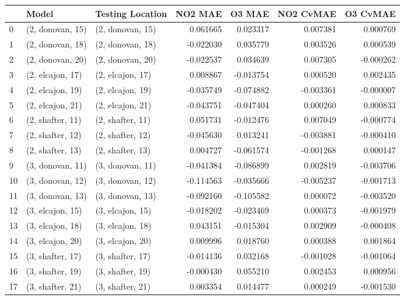 \begin{tabular}{lllrrrr}
\toprule
{} &             Model &  Testing Location &   NO2 MAE &    O3 MAE &  NO2 CvMAE &  O3 CvMAE \\
\midrule
0  &  (2, donovan, 15) &  (2, donovan, 15) &  0.061665 &  0.023317 &   0.007381 &  0.000769 \\
1  &  (2, donovan, 18) &  (2, donovan, 18) & -0.022030 &  0.035779 &   0.003526 &  0.000539 \\
2  &  (2, donovan, 20) &  (2, donovan, 20) & -0.022537 &  0.034639 &   0.007305 & -0.000262 \\
3  &  (2, elcajon, 17) &  (2, elcajon, 17) &  0.008867 & -0.013754 &   0.000520 &  0.002435 \\
4  &  (2, elcajon, 19) &  (2, elcajon, 19) & -0.035749 & -0.074882 &  -0.003361 & -0.000007 \\
5  &  (2, elcajon, 21) &  (2, elcajon, 21) & -0.043751 & -0.047404 &   0.000260 &  0.000833 \\
6  &  (2, shafter, 11) &  (2, shafter, 11) &  0.051731 & -0.012476 &   0.007049 & -0.000774 \\
7  &  (2, shafter, 12) &  (2, shafter, 12) & -0.045630 &  0.013241 &  -0.003881 & -0.000410 \\
8  &  (2, shafter, 13) &  (2, shafter, 13) &  0.004727 & -0.061574 &  -0.001268 &  0.000147 \\
9  &  (3, donovan, 11) &  (3, donovan, 11) & -0.041384 & -0.086899 &   0.002819 & -0.003706 \\
10 &  (3, donovan, 12) &  (3, donovan, 12) & -0.114563 & -0.035666 &  -0.005237 & -0.001713 \\
11 &  (3, donovan, 13) &  (3, donovan, 13) & -0.092160 & -0.105582 &   0.000072 & -0.003520 \\
12 &  (3, elcajon, 15) &  (3, elcajon, 15) & -0.018202 & -0.023469 &   0.000373 & -0.001979 \\
13 &  (3, elcajon, 18) &  (3, elcajon, 18) &  0.043151 & -0.015304 &   0.002909 & -0.000408 \\
14 &  (3, elcajon, 20) &  (3, elcajon, 20) &  0.009996 &  0.018760 &   0.000388 &  0.001864 \\
15 &  (3, shafter, 17) &  (3, shafter, 17) & -0.014136 &  0.032168 &  -0.001028 & -0.001064 \\
16 &  (3, shafter, 19) &  (3, shafter, 19) & -0.000430 &  0.055210 &   0.002453 &  0.000956 \\
17 &  (3, shafter, 21) &  (3, shafter, 21) &  0.003354 &  0.014477 &   0.000249 & -0.001530 \\

\end{tabular}
